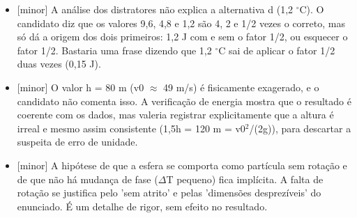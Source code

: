 \documentclass{article}%
\begin{document}
\begin{itemize}%
\item%
{[}minor{]} A análise dos distratores não explica a alternativa d (1,2 $^\circ$C). O candidato diz que os valores 9,6, 4,8 e 1,2 são 4, 2 e 1/2 vezes o correto, mas só dá a origem dos dois primeiros: 1,2 J com e sem o fator 1/2, ou esquecer o fator 1/2. Bastaria uma frase dizendo que 1,2 $^\circ$C sai de aplicar o fator 1/2 duas vezes (0,15 J).%
\item%
{[}minor{]} O valor h = 80 m (v0 $\approx$ 49 m/s) é fisicamente exagerado, e o candidato não comenta isso. A verificação de energia mostra que o resultado é coerente com os dados, mas valeria registrar explicitamente que a altura é irreal e mesmo assim consistente (1,5h = 120 m = v0$^2$/(2g)), para descartar a suspeita de erro de unidade.%
\item%
{[}minor{]} A hipótese de que a esfera se comporta como partícula sem rotação e de que não há mudança de fase ($\Delta$T pequeno) fica implícita. A falta de rotação se justifica pelo 'sem atrito' e pelas 'dimensões desprezíveis' do enunciado. É um detalhe de rigor, sem efeito no resultado.%
\end{itemize}%
\end{document}
